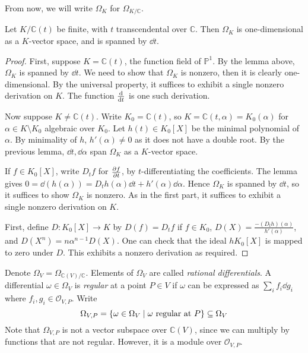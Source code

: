 From now, we will write \( \Omega_K \) for \( \Omega_{K/\mathbb C} \).
\begin{theorem}
    Let \( K/\mathbb C(t) \) be finite, with \( t \) transcendental over \( \mathbb C \).
    Then \( \Omega_K \) is one-dimensional as a \( K \)-vector space, and is spanned by \( \dd{t} \).
\end{theorem}
\begin{proof}
    First, suppose \( K = \mathbb C(t) \), the function field of \( \mathbb P^1 \).
    By the lemma above, \( \Omega_K \) is spanned by \( \dd{t} \).
    We need to show that \( \Omega_K \) is nonzero, then it is clearly one-dimensional.
    By the universal property, it suffices to exhibit a single nonzero derivation on \( K \).
    The function \( \dv{t} \) is one such derivation.

    Now suppose \( K \neq \mathbb C(t) \).
    Write \( K_0 = \mathbb C(t) \), so \( K = \mathbb C(t,\alpha) = K_0(\alpha) \) for \( \alpha \in K \setminus K_0 \) algebraic over \( K_0 \).
    Let \( h(t) \in K_0[X] \) be the minimal polynomial of \( \alpha \).
    By minimality of \( h \), \( h'(\alpha) \neq 0 \) as it does not have a double root.
    By the previous lemma, \( \dd{t}, \dd{\alpha} \) span \( \Omega_K \) as a \( K \)-vector space.

    If \( f \in K_0[X] \), write \( D_t f \) for \( \pdv{f}{t} \), by \( t \)-differentiating the coefficients.
    The lemma gives \( 0 = \dd{(h(\alpha))} = D_t h(\alpha) \dd{t} + h'(\alpha) \dd{\alpha} \).
    Hence \( \Omega_K \) is spanned by \( \dd{t} \), so it suffices to show \( \Omega_K \) is nonzero.
    As in the first part, it suffices to exhibit a single nonzero derivation on \( K \).

    First, define \( D \colon K_0[X] \to K \) by \( D(f) = D_t f \) if \( f \in K_0 \), \( D(X) = \frac{-(D_t h)(\alpha)}{h'(\alpha)} \), and \( D(X^n) = n\alpha^{n-1} D(X) \).
    One can check that the ideal \( hK_0[X] \) is mapped to zero under \( D \).
    This exhibits a nonzero derivation as required.
\end{proof}
Denote \( \Omega_V = \Omega_{\mathbb C(V)/\mathbb C} \).
Elements of \( \Omega_V \) are called \emph{rational differentials}.
A differential \( \omega \in \Omega_V \) is \emph{regular} at a point \( P \in V \) if \( \omega \) can be expressed as \( \sum_i f_i \dd{g_i} \) where \( f_i, g_i \in \mathcal O_{V,P} \).
Write
\[ \Omega_{V,P} = \qty{\omega \in \Omega_V \mid \omega \text{ regular at } P} \subseteq \Omega_V \]
Note that \( \Omega_{V,P} \) is not a vector subspace over \( \mathbb C(V) \), since we can multiply by functions that are not regular.
However, it is a module over \( \mathcal O_{V,P} \).

